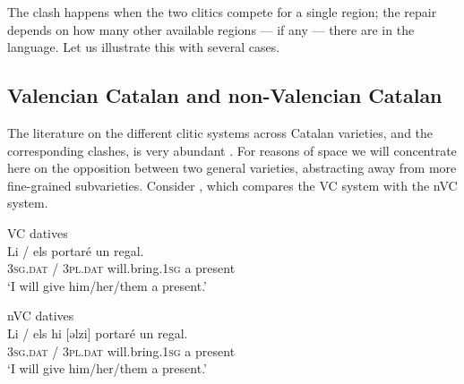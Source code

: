 \documentclass[output=paper,modfonts,nonflat,newtxmath,colorlinks,citecolor=brown]{langsci/langscibook}
\begin{document}
          

  

The clash happens when the two clitics compete for a single region; the repair depends on how many other available regions — if any — there are in the language. Let us illustrate this with several cases.

\subsection{Valencian Catalan and non-Valencian Catalan} %
\label{sec:cabre:3.1}

The literature on the different clitic systems across Catalan varieties, and the corresponding clashes, is very abundant \citep{Bonet1993, Martin2012}. For reasons of space we will concentrate here on the opposition between two general varieties, abstracting away from more fine-grained subvarieties. Consider , which compares the VC system with the nVC system.

\ea%
    \label{ex:cabre:9}
    \ea VC datives \\
    \gll Li / els portaré un regal.\\
        \textsc{3sg}.\textsc{dat} / \textsc{3pl.dat} will.bring.\textsc{1sg} a present\\
    \glt ‘I will give him/her/them a present.’
    
    \ex nVC datives\\
    \gll Li / {els hi [ǝlzi]} portaré  un regal.\\
    \textsc{3sg.dat} / \textsc{3pl.dat} will.bring.\textsc{1sg} a present\\
    \glt ‘I will give him/her/them a present.’
    \z
    \z
\end{document}
